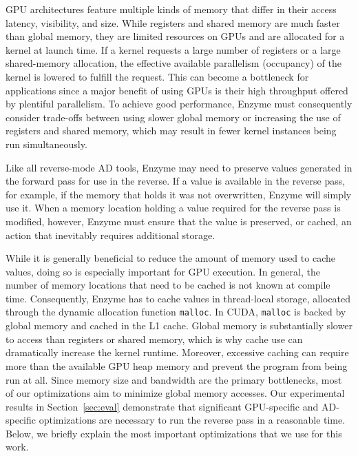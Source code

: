 GPU architectures feature multiple kinds of memory that differ in their access latency, visibility, and size.
While registers and shared memory are much faster than global memory, they are limited resources on GPUs and are allocated for a kernel at launch time. If a kernel requests a
large number of registers or a large shared-memory allocation, the effective available parallelism (occupancy) of the kernel is lowered to fulfill
the request. This can become a bottleneck for applications since a major benefit of using GPUs is their high throughput offered by plentiful parallelism.
To achieve good performance, Enzyme must consequently consider trade-offs between using slower global memory or increasing the use of registers and shared memory, which may result in fewer kernel instances being run simultaneously.

Like all reverse-mode AD tools, Enzyme may need to preserve values generated in the forward pass for use in the reverse. If a value is available in the reverse pass, for example, if the memory that holds it was not overwritten, Enzyme will simply use it.
When a memory location holding a value required for the reverse pass is modified, however, Enzyme must ensure that the value is preserved, or cached, an action that inevitably requires additional storage.

While it is generally beneficial to reduce the amount of memory used to cache values, doing so is especially important for GPU execution.
In general, the number of memory locations that need to be cached is not known at compile time.
Consequently, Enzyme has to cache values in thread-local storage, allocated through the dynamic allocation function \lstinline|malloc|. In CUDA, \lstinline|malloc| is backed by global memory and cached in the L1 cache. Global memory is substantially slower to access than registers or shared memory, which is why cache use can dramatically increase the kernel runtime. Moreover, excessive caching can require more than the available GPU heap memory and prevent the program from being run at all. Since memory size and bandwidth are the primary bottlenecks, most of our optimizations aim to minimize global memory accesses.
Our experimental results in Section~\ref{sec:eval} demonstrate that significant GPU-specific and AD-specific optimizations are necessary to run the reverse pass in a reasonable time.
Below, we briefly explain the most important optimizations that we use for this work.

